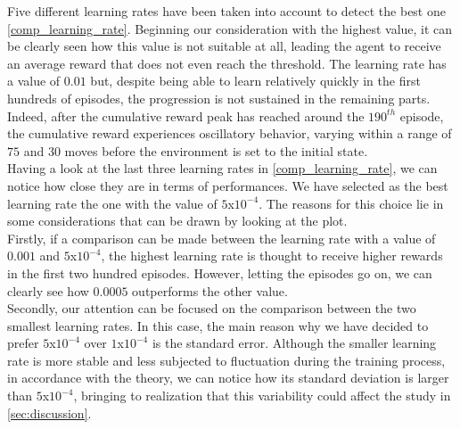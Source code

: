 \documentclass{article}
\begin{document}
   Five different learning rates have been taken into account to detect the best one \autoref{comp_learning_rate}. 
   Beginning our consideration with the highest value, it can be clearly seen how this value is not suitable at all, 
   leading the agent to receive an average reward that does not even reach the threshold. 
   The learning rate has a value of $0.01$ but, despite being able to learn relatively quickly in the first hundreds of episodes, 
   the progression is not sustained in the remaining parts. 
   Indeed, after the cumulative reward peak has reached around the $190^{th}$ episode, the cumulative reward experiences oscillatory behavior, 
   varying within a range of $75$ and $30$ moves before the environment is set to the initial state.\\
   Having a look at the last three learning rates in \autoref{comp_learning_rate}, we can notice how close they are in terms of performances. 
   We have selected as the best learning rate the one with the value of $5$x$10^{-4}$. 
   The reasons for this choice lie in some considerations that can be drawn by looking at the plot.\\
   Firstly, if a comparison can be made between the learning rate with a value of $0.001$ and $5$x$10^{-4}$, the highest learning rate is thought to receive higher rewards in the first two hundred episodes. 
   However, letting the episodes go on, we can clearly see how $0.0005$ outperforms the other value.\\
   Secondly, our attention can be focused on the comparison between the two smallest learning rates. 
   In this case, the main reason why we have decided to prefer $5$x$10^{-4}$ over $1$x$10^{-4}$ is the standard error. 
   Although the smaller learning rate is more stable and less subjected to fluctuation during the training process, in accordance with the theory, 
   we can notice how its standard deviation is larger than $5$x$10^{-4}$, bringing to realization that this variability could affect the study in \autoref{sec:discussion}.
\end{document}
